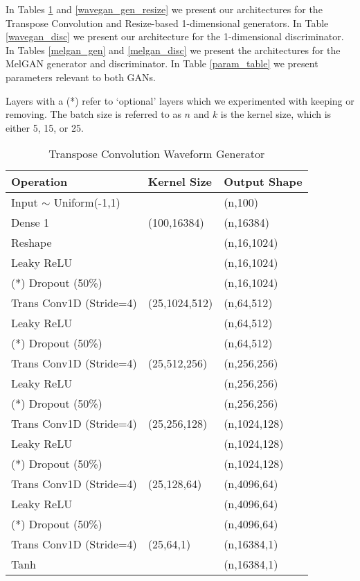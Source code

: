 
In Tables \ref{wavegan_gen} and \ref{wavegan_gen_resize} we present our architectures for the Transpose Convolution and Resize-based 1-dimensional generators. In Table \ref{wavegan_disc} we present our architecture for the 1-dimensional discriminator. In Tables \ref{melgan_gen} and \ref{melgan_disc} we present the architectures for the MelGAN generator and discriminator. In Table \ref{param_table} we present parameters relevant to both GANs.

Layers with a (*) refer to `optional' layers which we experimented with keeping or removing. The batch size is referred to as $n$ and $k$ is the kernel size, which is either 5, 15, or 25.

\begin{table}[H]
\caption{Transpose Convolution Waveform Generator}\label{wavegan_gen}
\centering
\begin{tabular}{l|l|l}
Operation & Kernel Size & Output Shape \\ \hline
Input $\sim$ Uniform(-1,1) & \  & (n,100)\\
Dense 1 & (100,16384) & (n,16384)\\
Reshape & \ & (n,16,1024)\\
Leaky ReLU & \ & (n,16,1024)\\
(*) Dropout (50\%) & \ & (n,16,1024)\\
Trans Conv1D (Stride=4) & (25,1024,512) & (n,64,512)\\
Leaky ReLU & \  & (n,64,512)\\
(*) Dropout (50\%) & \  & (n,64,512)\\
Trans Conv1D (Stride=4) & (25,512,256) & (n,256,256)\\
Leaky ReLU & \  & (n,256,256)\\
(*) Dropout (50\%) & \  & (n,256,256)\\
Trans Conv1D (Stride=4) & (25,256,128) & (n,1024,128)\\
Leaky ReLU & \  & (n,1024,128)\\
(*) Dropout (50\%) & \  & (n,1024,128)\\
Trans Conv1D (Stride=4) & (25,128,64) & (n,4096,64)\\
Leaky ReLU & \  & (n,4096,64)\\
(*) Dropout (50\%) & \  & (n,4096,64)\\
Trans Conv1D (Stride=4) & (25,64,1) & (n,16384,1)\\
Tanh & \  & (n,16384,1)\\
\end{tabular}
\end{table}

